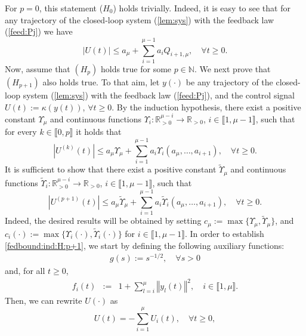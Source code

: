 \documentclass[letterpaper, 10pt]{article}
\newcommand{\rref}[1]{(\ref{#1})}
\newcommand{\norme}[1]{\left\Vert #1\right\Vert}
\newcommand{\abs}[1]{\left| #1 \right|}
\newcommand{\reels}{\mathbb{R}}
\newcommand{\entiers}{\mathbb{N}}
\begin{document}
For $p=0$, this statement ($H_0$) holds trivially. Indeed, it is easy to see that for any trajectory of the closed-loop system \rref{lem:sys} with the feedback law \rref{feed:Pj} we have
\begin{equation*}
\abs{U(t)} \leq a_\mu +  \sum\limits_{i=1}^{\mu-1} a_i Q_{i+1, \mu}, \quad \forall t \geq 0. 
\end{equation*} 
Now, assume that $(H_p)$ holds true for some $p \in \entiers$. We next prove that $(H_{p+1})$ also holds true. To that aim, let $y(\cdot)$ be any trajectory of the closed-loop system \rref{lem:sys} with the feedback law \rref{feed:Pj}, and the control signal $U(t):= \kappa(y(t))$, $\forall t \geq 0 $. By the induction hypothesis, there exist a positive constant $\Upsilon_\mu$ and continuous functions $\Upsilon_i : \reels^{\mu -i}_{>0 } \to \reels_{>0} $, $i \in \llbracket 1 , \mu -1 \rrbracket$, such that for every $k \in \llbracket 0 ,p \rrbracket $  it holds that 
\begin{equation}
\label{fedbound:ind:H}
\abs{U^{(k)}(t)} \leq a_\mu \Upsilon_\mu + \sum\limits_{i=1}^{ \mu - 1 } a_i\Upsilon_i( a_\mu , \ldots , a_{i+1} ),\quad \forall t\geq 0.
\end{equation}
It is sufficient to show that there exist a positive constant $\tilde{\Upsilon}_\mu$ and continuous functions $\tilde{\Upsilon}_i : \reels^{\mu -i}_{>0 } \to \reels_{>0} $, $i \in \llbracket 1 , \mu -1 \rrbracket$, such that
\begin{equation}
\label{fedbound:ind:H:p+1}
\abs{U^{(p+1)}(t)} \leq a_\mu \tilde{\Upsilon}_\mu + \sum\limits_{i=1}^{ \mu - 1 } a_i \tilde{\Upsilon}_i( a_\mu , \ldots , a_{i+1} ),\quad \forall t\geq 0.
\end{equation}
Indeed, the desired results will be obtained by setting $c_\mu := \max \lbrace \Upsilon_\mu , \tilde{\Upsilon}_{\mu} \rbrace$, and $c_i( \cdot) := \max\lbrace \Upsilon_i( \cdot)  , \tilde{\Upsilon}_i( \cdot)   \rbrace$ for $i \in \llbracket 1 , \mu -1 \rrbracket$. In order to establish \eqref{fedbound:ind:H:p+1}, we start by defining the following auxiliary functions: 
\begin{align}\label{g}
g(s):= s^{-1/2}, \quad \forall s > 0
\end{align}
and, for all $t \geq 0$,
\begin{eqnarray}
\label{f_i}
f_i(t) & := &1 +  \sum\limits_{l=i}^{\mu} \norme{y_l(t)}^2, \quad i \in \llbracket 1, \mu \rrbracket . 
\end{eqnarray}
Then, we can rewrite $U(\cdot)$ as 
\begin{equation}
\label{def:U_t}
U(t) = -  \sum\limits_{i=1}^{\mu} U_i(t), \quad \forall t \geq 0,
\end{equation}
\end{document}
